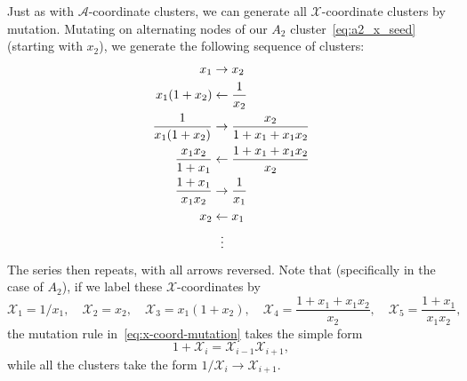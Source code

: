 \documentclass[11pt]{article}
\def\nl{\nonumber\\}
\def\nn{\nonumber}
\def\x{\mathcal{X}}
\def\a{\mathcal{A}}
\def\drawPentagon{
\coordinate (P1) at (90:1);
\coordinate (P2) at (18:1);
\coordinate (P3) at (306:1);
\coordinate (P4) at (234:1);
\coordinate (P5) at (162:1);
\draw (P1) -- (P2) -- (P3) -- (P4) -- (P5) -- cycle;
}
\begin{document}
Just as with $\a$-coordinate clusters, we can generate all $\x$-coordinate clusters by mutation. Mutating on alternating nodes of our $A_2$ cluster~\eqref{eq:a2_x_seed} (starting with $x_2$), we generate the following sequence of clusters:
\begin{align}
  x_1 &\to \color{black}{x_2} \nl
  \color{black}{x_1(1+x_2)} &\leftarrow \frac{1}{x_2} \nl
  \frac{1}{x_1(1+x_2)} &\to \color{black}{\frac{x_2}{1+x_1+x_1 x_2}} \\
  \color{black}{\frac{x_1 x_2}{1+x_1}} &\leftarrow \frac{1+x_1+x_1 x_2}{x_2} \nl
  \frac{1+x_1}{x_1 x_2} &\to \color{black}{\frac{1}{x_1}} \nl
  \color{black}{x_2} &\leftarrow x_1 \nl
  &\ \ \vdots \nn
\end{align}
The series then repeats, with all arrows reversed. Note that (specifically in the case of $A_2$), if we label these $\x$-coordinates by
\begin{equation}\label{def:a2-xcoords}
  \x_1 = 1/x_1, \quad \x_2 = x_2, \quad \x_3 = x_1(1+x_2), \quad 
  \x_4 = \frac{1+x_1+x_1 x_2}{x_2}, \quad \x_5 = \frac{1+x_1}{x_1 x_2},
\end{equation}
the mutation rule in~\eqref{eq:x-coord-mutation} takes the simple form
\begin{equation}\label{eq:exchange-relation}
  1+\x_i = \x_{i-1}\x_{i+1},
\end{equation}
while all the clusters take the form $1/\x_i \to \x_{i+1}$.
\end{document}

